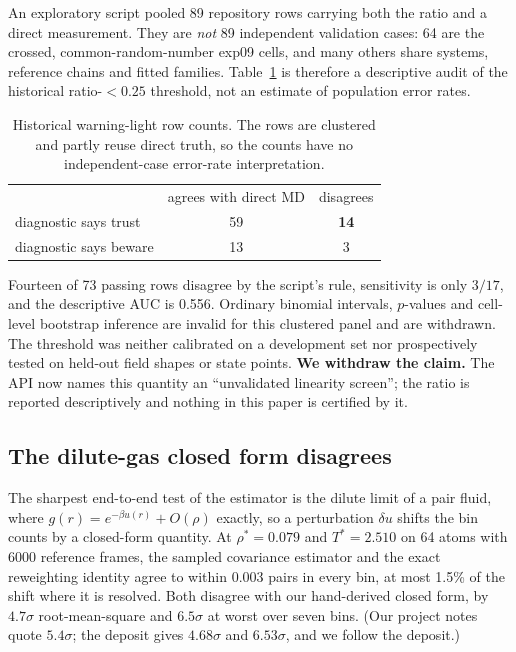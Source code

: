\documentclass[aip,jcp,reprint,amsmath,amssymb,floatfix]{revtex4-2}
\begin{document}
An exploratory script pooled 89 repository rows carrying both the ratio and a
direct measurement. They are \emph{not} 89 independent validation cases: 64 are
the crossed, common-random-number exp09 cells, and many others share systems,
reference chains and fitted families. Table~\ref{tab:warning} is therefore a
descriptive audit of the historical ratio-$<0.25$ threshold, not an estimate of
population error rates.

\begin{table}[t]
\caption{\label{tab:warning}Historical warning-light row counts. The rows are
clustered and partly reuse direct truth, so the counts have no independent-case
error-rate interpretation.}
\begin{ruledtabular}
\begin{tabular}{lcc}
 & agrees with direct MD & disagrees \\
\colrule
diagnostic says trust & 59 & \textbf{14} \\
diagnostic says beware & 13 & 3 \\
\end{tabular}
\end{ruledtabular}
\end{table}

Fourteen of 73 passing rows disagree by the script's rule, sensitivity is only
$3/17$, and the descriptive AUC is 0.556. Ordinary binomial intervals,
$p$-values and cell-level bootstrap inference are invalid for this clustered
panel and are withdrawn. The threshold was neither calibrated on a development
set nor prospectively tested on held-out field shapes or state points.
\textbf{We withdraw the claim.} The API now names this quantity an
``unvalidated linearity screen''; the ratio is reported descriptively and
nothing in this paper is certified by it.

\subsection{The dilute-gas closed form disagrees}
\label{sec:dilute}

The sharpest end-to-end test of the estimator is the dilute limit of a
pair fluid, where $g(r) = e^{-\beta u(r)} + O(\rho)$ exactly\cite{HansenMcDonald2013},
so a perturbation $\delta u$ shifts the bin counts by
a closed-form quantity. At $\rho^* = 0.079$ and $T^* = 2.510$
on 64 atoms with 6000 reference frames, the sampled covariance estimator and the
exact reweighting identity agree to within 0.003 pairs in every
bin, at most 1.5\% of the shift where it is resolved. Both
disagree with our hand-derived closed form, by $4.7\sigma$ root-mean-square and
$6.5\sigma$ at worst over seven bins. (Our project notes quote $5.4\sigma$; the
deposit gives $4.68\sigma$ and $6.53\sigma$, and we follow the deposit.)
\end{document}
